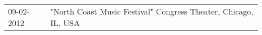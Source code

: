 \begin{supertabular}{ll}
 09-02-2012 &  "North Coast Music Festival" Congress Theater, Chicago, IL, USA \\
\end{supertabular}
